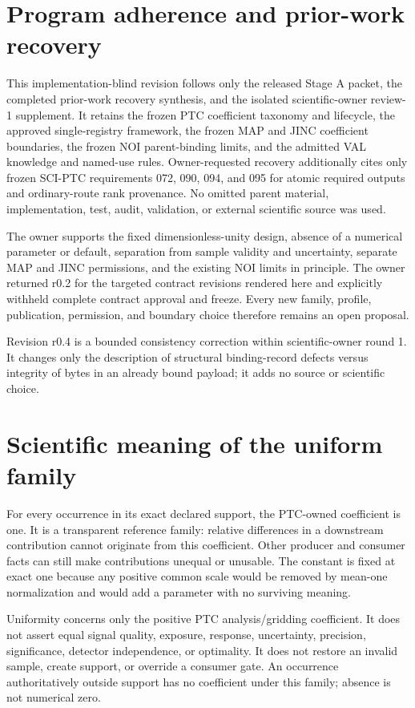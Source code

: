 \section{Program adherence and prior-work recovery}

This implementation-blind revision follows only the released Stage A packet,
the completed prior-work recovery synthesis, and the isolated scientific-owner
review-1 supplement. It retains the frozen PTC coefficient taxonomy and
lifecycle, the approved single-registry framework, the frozen MAP and JINC
coefficient boundaries, the frozen NOI parent-binding limits, and the admitted
VAL knowledge and named-use rules. Owner-requested recovery additionally cites
only frozen SCI-PTC requirements 072, 090, 094, and 095 for atomic required
outputs and ordinary-route rank provenance. No omitted parent material,
implementation, test, audit, validation, or external scientific source was
used.

The owner supports the fixed dimensionless-unity design, absence of a
numerical parameter or default, separation from sample validity and
uncertainty, separate MAP and JINC permissions, and the existing NOI limits in
principle. The owner returned r0.2 for the targeted contract revisions rendered
here and explicitly withheld complete contract approval and freeze. Every new
family, profile, publication, permission, and boundary choice therefore
remains an open proposal.

Revision r0.4 is a bounded consistency correction within scientific-owner
round 1. It changes only the description of structural binding-record defects
versus integrity of bytes in an already bound payload; it adds no source or
scientific choice.

\section{Scientific meaning of the uniform family}

For every occurrence in its exact declared support, the PTC-owned coefficient
is one. It is a transparent reference family: relative differences in a
downstream contribution cannot originate from this coefficient. Other
producer and consumer facts can still make contributions unequal or unusable.
The constant is fixed at exact one because any positive common scale would be
removed by mean-one normalization and would add a parameter with no surviving
meaning.

Uniformity concerns only the positive PTC analysis/gridding coefficient. It
does not assert equal signal quality, exposure, response, uncertainty,
precision, significance, detector independence, or optimality. It does not
restore an invalid sample, create support, or override a consumer gate. An
occurrence authoritatively outside support has no coefficient under this
family; absence is not numerical zero.

